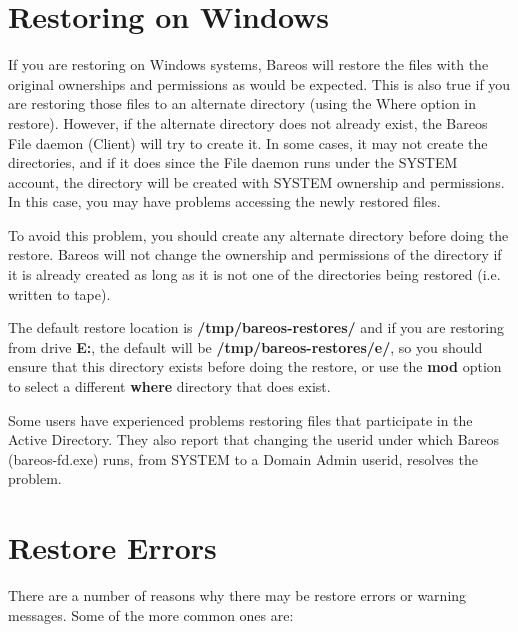 \section{Restoring on Windows}
\label{Windows}

If you are restoring on Windows systems, Bareos will restore the files
with the original ownerships and permissions as would be expected.  This is
also true if you are restoring those files to an alternate directory (using
the Where option in restore).  However, if the alternate directory does not
already exist, the Bareos File daemon (Client) will try to create it.  In
some cases, it may not create the directories, and if it does since the
File daemon runs under the SYSTEM account, the directory will be created
with SYSTEM ownership and permissions.  In this case, you may have problems
accessing the newly restored files.

To avoid this problem, you should create any alternate directory before
doing the restore.  Bareos will not change the ownership and permissions of
the directory if it is already created as long as it is not one of the
directories being restored (i.e.  written to tape).

The default restore location is {\bf /tmp/bareos-restores/} and if you are
restoring from drive {\bf E:}, the default will be
{\bf /tmp/bareos-restores/e/}, so you should ensure that this directory
exists before doing the restore, or use the {\bf mod} option to
select a different {\bf where} directory that does exist.

Some users have experienced problems restoring files that participate in
the Active Directory. They also report that changing the userid under which
Bareos (bareos-fd.exe) runs, from SYSTEM to a Domain Admin userid, resolves
the problem.




\section{Restore Errors}

There are a number of reasons why there may be restore errors or
warning messages. Some of the more common ones are:

